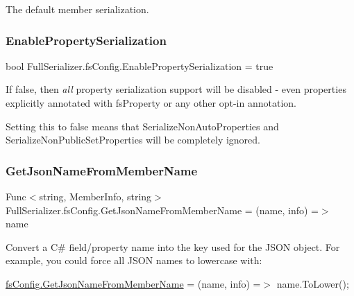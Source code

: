 The default member serialization. 

\mbox{\label{class_full_serializer_1_1fs_config_a27026d7a85a80b1512249b1a82f23f84}} 
\subsubsection{\texorpdfstring{Enable\+Property\+Serialization}{EnablePropertySerialization}}
{\footnotesize\ttfamily bool Full\+Serializer.\+fs\+Config.\+Enable\+Property\+Serialization = true}



If false, then {\itshape all} property serialization support will be disabled -\/ even properties explicitly annotated with fs\+Property or any other opt-\/in annotation. 

Setting this to false means that Serialize\+Non\+Auto\+Properties and Serialize\+Non\+Public\+Set\+Properties will be completely ignored. \mbox{\label{class_full_serializer_1_1fs_config_a2748a43e18efe642c9cbe4d74583c554}} 
\subsubsection{\texorpdfstring{Get\+Json\+Name\+From\+Member\+Name}{GetJsonNameFromMemberName}}
{\footnotesize\ttfamily Func$<$string, Member\+Info, string$>$ Full\+Serializer.\+fs\+Config.\+Get\+Json\+Name\+From\+Member\+Name = (name, info) =$>$ name}



Convert a C\# field/property name into the key used for the J\+S\+ON object. For example, you could force all J\+S\+ON names to lowercase with\+: 

\hyperlink{class_full_serializer_1_1fs_config_a2748a43e18efe642c9cbe4d74583c554}{fs\+Config.\+Get\+Json\+Name\+From\+Member\+Name} = (name, info) =$>$ name.\+To\+Lower();

